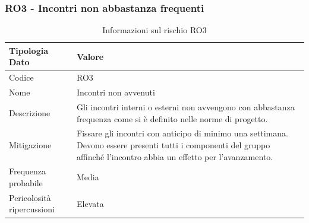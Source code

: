 \documentclass[a4paper,12pt]{article}
\begin{document}
\subsubsection{RO3 - Incontri non abbastanza frequenti}
\begin{table}[H]
    \centering
    \renewcommand{\arraystretch}{1.4}
    \begin{tabularx}{\textwidth}{|L|Z|}
        \hline
        \textbf{Tipologia Dato} & \textbf{Valore} \\
        \hline
        Codice & RO3 \\
        \hline
        Nome & Incontri non avvenuti \\
        \hline
        Descrizione & Gli incontri interni o esterni non avvengono con abbastanza frequenza come si è definito nelle norme di progetto.\\
        \hline
        Mitigazione & Fissare gli incontri con anticipo di minimo una settimana. Devono essere presenti tutti i componenti del gruppo affinché l'incontro abbia un effetto per l'avanzamento. \\
        \hline
        Frequenza probabile & Media \\
        \hline
        Pericolosità ripercussioni & Elevata \\
        \hline
    \end{tabularx}
    \caption{Informazioni sul rischio RO3}
    \label{tab:RO3}
\end{table}
\end{document}
